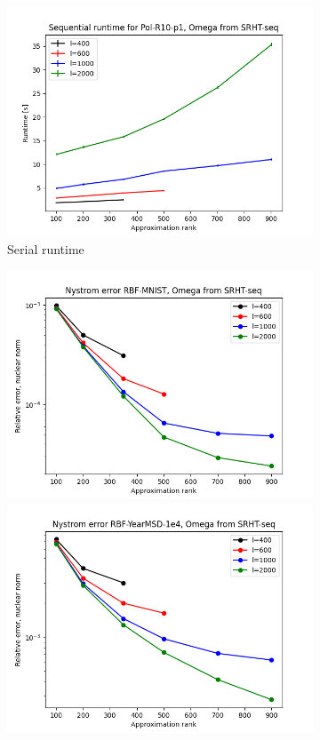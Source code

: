 \documentclass{article}
\theoremstyle{definition}
\begin{document}
\begin{appendices}
\begin{figure}
\begin{subfigure}[t]{\textwidth+20pt\relax}
    \includegraphics[width=\dimexpr\linewidth-20pt\relax]{plots/runtime/runtime_Pol-R10-p1_SRHT-seq.png}
    \caption{Serial runtime}
\end{subfigure}\hfill
\begin{subfigure}[t]{0.35\textwidth}
    \includegraphics[width=\textwidth]{plots/relerror/relerror_RBF-MNIST_SRHT-seq.png}
    \includegraphics[width=\textwidth]{plots/relerror/relerror_RBF-YearMSD-1e4_SRHT-seq.png}

\end{subfigure}
\end{figure}
\end{appendices}
\end{document}
